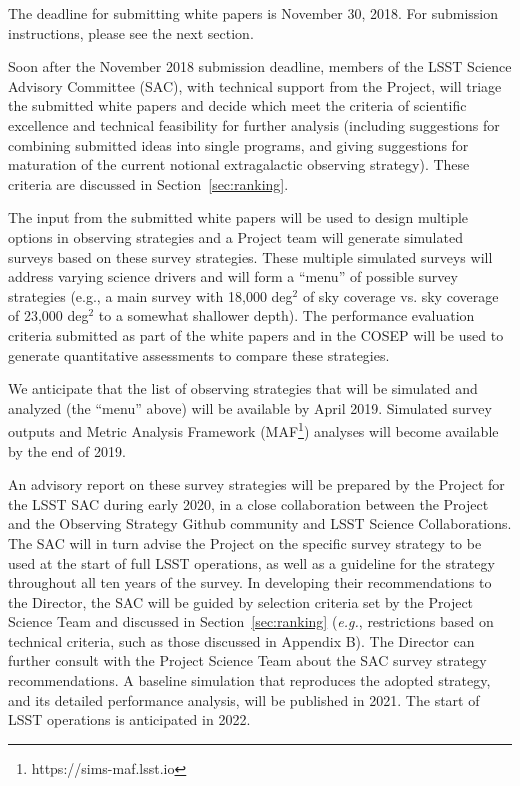 \documentclass[DM,lsstdraft,toc,usenatbib]{lsstdoc}
\begin{document}
The deadline for submitting white papers is November 30, 2018. For submission instructions, 
please see the next section. 

Soon after the November 2018 submission deadline, members of the LSST Science Advisory Committee (SAC), 
with technical support from the Project, 
will triage the submitted white papers and decide which meet the criteria of scientific excellence and 
technical feasibility for further analysis (including suggestions for combining 
submitted ideas into single programs, and giving suggestions for maturation of the current notional 
extragalactic observing strategy). These criteria are discussed in Section~\ref{sec:ranking}. 

The input from the submitted white papers will be used to design multiple
options in observing strategies and a Project team will generate 
simulated surveys based on these survey strategies. 
These multiple simulated surveys will address varying science drivers and will form a 
``menu'' of possible survey strategies (e.g., a main 
survey with 18,000 deg$^2$ of sky coverage vs. sky coverage of 23,000 deg$^2$ to a
somewhat shallower depth). The performance evaluation criteria submitted as part of the 
white papers and in the COSEP will be used to generate quantitative assessments to compare these strategies. 

We anticipate that the list of observing strategies that will be simulated and analyzed 
(the ``menu'' above) will be available by April 2019. Simulated survey outputs and Metric Analysis 
Framework (MAF\footnote{https://sims-maf.lsst.io}) analyses will become available by the end 
of 2019. 

An advisory report on these survey strategies will be prepared by the Project for the LSST SAC during early 2020, 
in a close collaboration between the Project and the Observing Strategy Github community and 
LSST Science Collaborations. The SAC will in turn advise the Project on the specific survey strategy 
to be used at the start of full LSST operations, as well as a guideline for the strategy throughout all ten years of the survey. 
In developing their recommendations to the Director, the SAC will be guided by selection 
criteria set by the Project Science Team and discussed in Section~\ref{sec:ranking} ({\it e.g.}, restrictions 
based on technical criteria, such as those discussed in Appendix B). The Director can further consult with the Project Science 
Team about the SAC survey strategy recommendations. A baseline simulation that reproduces the
adopted strategy, and its detailed performance analysis, will be published in 2021. 
The start of LSST operations is anticipated in 2022.
\end{document}
